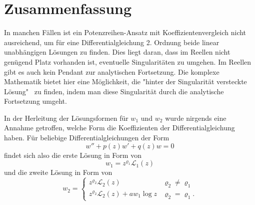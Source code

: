 \section{Zusammenfassung}
In manchen Fällen ist ein Potenzreihen-Ansatz mit Koeffizientenvergleich nicht ausreichend, um für eine Differentialgleichung 2. Ordnung beide linear unabhängigen Lösungen zu finden. 
Dies liegt daran, dass im Reellen nicht genügend Platz vorhanden ist, eventuelle Singularitäten zu umgehen. 
Im Reellen gibt es auch kein Pendant zur analytischen Fortsetzung. 
Die komplexe Mathematik bietet hier eine Möglichkeit, die "hinter der Singularität versteckte Lösung" \ zu finden, indem man diese Singularität durch die analytische Fortsetzung umgeht. 

In der Herleitung der Lösungsformen für $w_1$ und $w_2$ wurde nirgends eine Annahme getroffen, welche Form die Koeffizienten der Differentialgleichung haben. 
Für beliebige Differentialgleichungen der Form
\[w'' + p(z)w' + q(z)w=0\]
findet sich also die erste Lösung in Form von
\[ w_1 = z^{\varrho_1}\mathcal{L}_1(z)\]
und die zweite Lösung in Form von
\[w_2 = \begin{cases}
z^{\varrho_2}\mathcal{L}_2(z) & \varrho_2\ne\varrho_1 \\
z^{\varrho_2}\mathcal{L}_2(z) + a w_1 \log z & \varrho_2=\varrho_1.
\end{cases} \]
